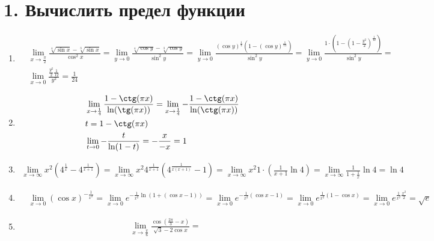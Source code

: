 \documentclass{article}
\author{Бугрий Илья M3134}
\date{November 2023}
\begin{document}
\section*{1. Вычислить предел функции}
\begin{enumerate}
    \item 
    \begin{align*}
        &\lim\limits_{x \to \frac{\pi}{2}}{\frac{\sqrt[4]{\sin x} - \sqrt[3]{\sin x}}{\cos^{2} x}} = 
        \lim\limits_{y \to 0}{\frac{\sqrt[4]{\cos y} - \sqrt[3]{\cos y}}{\sin^{2} y}} = 
        \lim\limits_{y \to 0}{\frac{(\cos y)^{\frac{1}{4}}(1 - (\cos y)^{\frac{1}{12}})}{\sin^{2}y}} = 
        \lim\limits_{y \to 0}{
            \frac{1 \cdot (1 - (1 - \frac{y^{2}}{2})^{\frac{1}{12}})}{\sin ^{2} y} 
        } =  \\
        &\lim\limits_{x \to 0}{\frac{\frac{y^2}{2}\frac{1}{12}}{y^{2}}} = \frac{1}{24}
    \end{align*}
    \item 
    \begin{align*}
        &\lim\limits_{x \to \frac{1}{4}}{\frac{1 - \ctg (\pi x)}{\ln (\tg (\pi x))}} = \lim\limits_{x \to \frac{1}{4}}{-\frac{1 - \ctg (\pi x)}{\ln (\ctg (\pi x))}} \\
        & t = 1 - \ctg (\pi x) \\
        &\lim\limits_{t \to 0}{-\frac{t}{\ln (1 - t)}} = -\frac{x}{-x} = 1
    \end{align*}
    \item 
    \begin{align*}
       \lim\limits_{x \to \infty}{x^{2}(4^{\frac{1}{x}} - 4^{\frac{1}{x + 1}})} = 
       \lim\limits_{x \to \infty}{x^2 4^{\frac{1}{x + 1}}(4^{\frac{1}{x(x + 1)}} - 1)} = 
       \lim\limits_{x \to \infty}{x^{2} 1\cdot(\frac{1}{x + 1}\ln 4)} =
       \lim\limits_{x \to \infty}{\frac{1}{1 + \frac{1}{x}}\ln 4} = \ln 4
    \end{align*}
    \item 
    \begin{align*}
        &\lim\limits_{x \to 0}{(\cos x)^{-\frac{1}{x^{2}}}} = \lim\limits_{x \to 0}{e^{-\frac{1}{x^{2}}\ln(1 + (\cos x - 1))}} =
        \lim\limits_{x \to 0}{e^{-\frac{1}{x^{2}}(\cos x - 1)}} = \lim\limits_{x \to 0}{e^{\frac{1}{x^{2}}(1 - \cos x)}} = \lim\limits_{x \to 0}{e^{\frac{1}{x^{2}}\frac{x^{2}}{2}}} = \sqrt{e}
    \end{align*}
    \item
    \begin{align*}
        &\lim\limits_{x \to \frac{\pi}{6}}{\frac{\cos (\frac{2 \pi}{3} - x)}{\sqrt{3} - 2\cos x}} =

\end{align*}
\end{enumerate}
\end{document}
